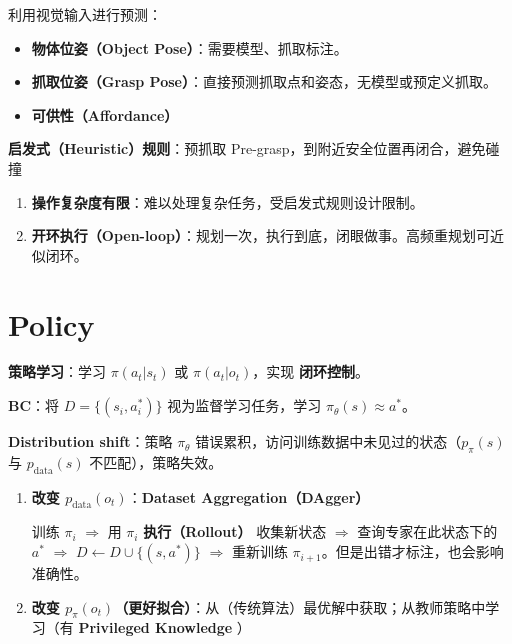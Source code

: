 \documentclass[
  8pt]{extarticle}
\providecommand{\tightlist}{%
  \setlength{\itemsep}{0pt}\setlength{\parskip}{0pt}}
\begin{document}
\begin{multicols*}{4}
利用视觉输入进行预测：

\begin{itemize}
\tightlist
\item
  \textbf{物体位姿（Object Pose）}：需要模型、抓取标注。
\item
  \textbf{抓取位姿（Grasp
  Pose）}：直接预测抓取点和姿态，无模型或预定义抓取。
\item
  \textbf{可供性（Affordance）}
\end{itemize}

\textbf{启发式（Heuristic）规则}：预抓取
Pre-grasp，到附近安全位置再闭合，避免碰撞

\begin{enumerate}
\def\labelenumi{\arabic{enumi}.}
\tightlist
\item
  \textbf{操作复杂度有限}：难以处理复杂任务，受启发式规则设计限制。
\item
  \textbf{开环执行（Open-loop）}：规划一次，执行到底，闭眼做事。高频重规划可近似闭环。
\end{enumerate}

\hypertarget{policy}{%
\section{Policy}\label{policy}}

\textbf{策略学习}：学习 \(\pi(a_t|s_t)\) 或 \(\pi(a_t|o_t)\)，实现
\textbf{闭环控制}。

\textbf{BC}：将 \(D = \{(s_i, a_i^*)\}\) 视为监督学习任务，学习
\(\pi_\theta(s) \approx a^*\)。

\textbf{Distribution shift}：策略 \(\pi_\theta\)
错误累积，访问训练数据中未见过的状态（\(p_\pi(s)\) 与
\(p_{\text{data}}(s)\) 不匹配），策略失效。

\begin{enumerate}
\def\labelenumi{\arabic{enumi}.}
\item
  \textbf{改变 \(p_{\text{data}}(o_t)\)}：\textbf{Dataset
  Aggregation（DAgger）}

  训练 \(\pi_i\) \(\Rightarrow\) 用 \(\pi_i\) \textbf{执行（Rollout）}
  收集新状态 \(\Rightarrow\) 查询专家在此状态下的 \(a^*\)
  \(\Rightarrow\) \(D \leftarrow D \cup \{(s, a^*)\}\) \(\Rightarrow\)
  重新训练 \(\pi_{i+1}\)。但是出错才标注，也会影响准确性。
\item
  \textbf{改变
  \(p_{\pi}(o_t)\)（更好拟合）}：从（传统算法）最优解中获取；从教师策略中学习（有
  \textbf{Privileged Knowledge} ）
\end{enumerate}


\end{multicols*}
\end{document}

